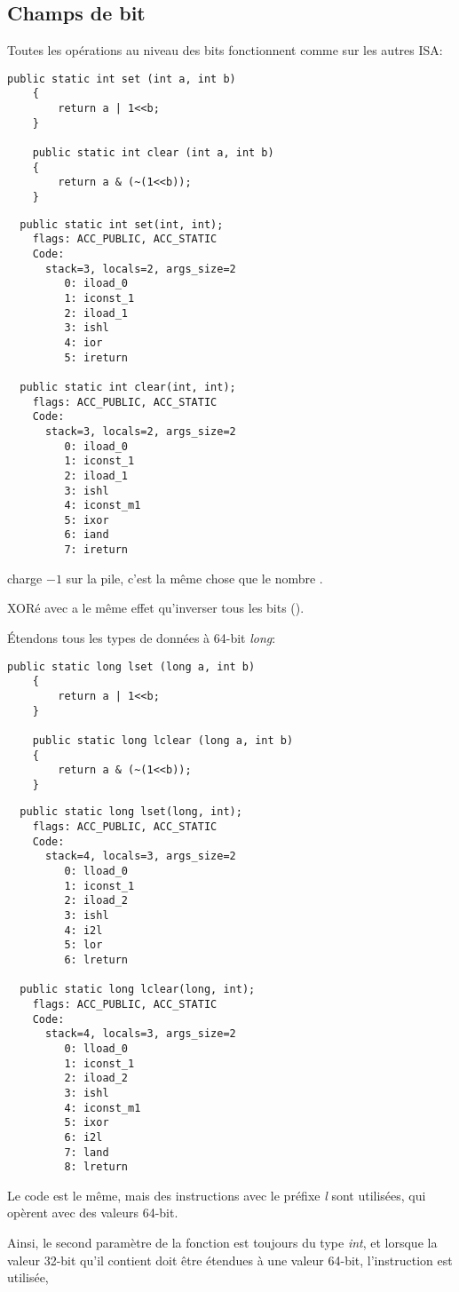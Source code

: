\subsection{Champs de bit}

Toutes les opérations au niveau des bits fonctionnent comme sur les autres \ac{ISA}:

\begin{lstlisting}[style=customjava]
	public static int set (int a, int b)
	{
		return a | 1<<b;
	}

	public static int clear (int a, int b)
	{
		return a & (~(1<<b));
	}
\end{lstlisting}

\begin{lstlisting}
  public static int set(int, int);
    flags: ACC_PUBLIC, ACC_STATIC
    Code:
      stack=3, locals=2, args_size=2
         0: iload_0
         1: iconst_1
         2: iload_1
         3: ishl
         4: ior
         5: ireturn

  public static int clear(int, int);
    flags: ACC_PUBLIC, ACC_STATIC
    Code:
      stack=3, locals=2, args_size=2
         0: iload_0
         1: iconst_1
         2: iload_1
         3: ishl
         4: iconst_m1
         5: ixor
         6: iand
         7: ireturn
\end{lstlisting}

 charge $-1$ sur la pile, c'est la même chose que le nombre .

XORé avec  a le même effet qu'inverser tous les bits ().

Étendons tous les types de données à 64-bit \emph{long}:

\begin{lstlisting}[style=customjava]
	public static long lset (long a, int b)
	{
		return a | 1<<b;
	}

	public static long lclear (long a, int b)
	{
		return a & (~(1<<b));
	}
\end{lstlisting}

\begin{lstlisting}
  public static long lset(long, int);
    flags: ACC_PUBLIC, ACC_STATIC
    Code:
      stack=4, locals=3, args_size=2
         0: lload_0
         1: iconst_1
         2: iload_2
         3: ishl
         4: i2l
         5: lor
         6: lreturn

  public static long lclear(long, int);
    flags: ACC_PUBLIC, ACC_STATIC
    Code:
      stack=4, locals=3, args_size=2
         0: lload_0
         1: iconst_1
         2: iload_2
         3: ishl
         4: iconst_m1
         5: ixor
         6: i2l
         7: land
         8: lreturn
\end{lstlisting}

Le code est le même, mais des instructions avec le préfixe \emph{l} sont utilisées,
qui opèrent avec des valeurs 64-bit.

Ainsi, le second paramètre de la fonction est toujours du type \emph{int}, et lorsque
la valeur 32-bit qu'il contient doit être étendues à une valeur 64-bit, l'instruction
 est utilisée, 

